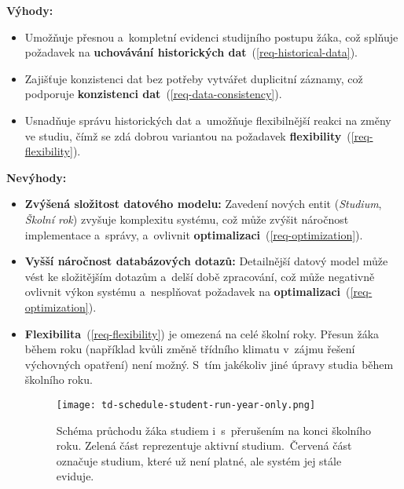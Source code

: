 \begin{enumerate}
    \textbf{Výhody:}
    \begin{itemize}
        \item Umožňuje přesnou a~kompletní evidenci studijního postupu žáka, což splňuje požadavek na \textbf{uchovávání historických dat}~(\ref{req-historical-data}).

        \item Zajišťuje konzistenci dat bez potřeby vytvářet duplicitní záznamy, což podporuje \textbf{konzistenci dat}~(\ref{req-data-consistency}).

        \item Usnadňuje správu historických dat a~umožňuje flexibilnější reakci na změny ve studiu, čímž se zdá dobrou variantou na požadavek \textbf{flexibility}~(\ref{req-flexibility}).
    \end{itemize}

    \textbf{Nevýhody:}
    \begin{itemize}
        \item \textbf{Zvýšená složitost datového modelu:} Zavedení nových entit (\textit{Studium}, \textit{Školní rok}) zvyšuje komplexitu systému, což může zvýšit náročnost implementace a~správy, a~ovlivnit \textbf{optimalizaci}~(\ref{req-optimization}).

        \item \textbf{Vyšší náročnost databázových dotazů:} Detailnější datový model může vést ke složitějším dotazům a~delší době zpracování, což může negativně ovlivnit výkon systému a~nesplňovat požadavek na \textbf{optimalizaci}~(\ref{req-optimization}).

        \item \textbf{Flexibilita}~(\ref{req-flexibility}) je omezená na celé školní roky. Přesun žáka během roku (například kvůli změně třídního klimatu v~zájmu řešení výchovných opatření) není možný. S~tím jakékoliv jiné úpravy studia během školního roku.

        \begin{figure}[H]
            \centering
            \texttt{[image: td-schedule-student-run-year-only.png]}
            \caption{Schéma průchodu žáka studiem i~s~přerušením na konci školního roku. Zelená část reprezentuje aktivní studium.~Červená část označuje studium, které už není platné, ale systém jej stále eviduje.}
            \label{fig:td-schedule-student-run-year-only}
        \end{figure}
    \end{itemize}


\end{enumerate}
